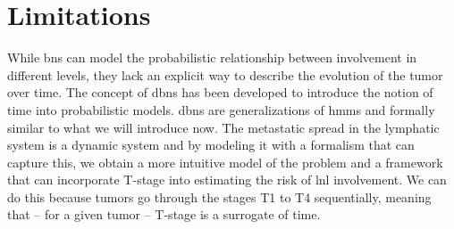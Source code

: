 \documentclass[\relativeRoot/main.tex]{subfiles}
\begin{document}
\section{Limitations}
\label{sec:previous_work:limitations}

While \glspl{bn} can model the probabilistic relationship between involvement in different levels, they lack an explicit way to describe the evolution of the tumor over time. The concept of \glspl{dbn} has been developed to introduce the notion of time into probabilistic models. \Glspl{dbn} are generalizations of \glspl{hmm} and formally similar to what we will introduce now. The metastatic spread in the lymphatic system is a dynamic system and by modeling it with a formalism that can capture this, we obtain a more intuitive model of the problem and a framework that can incorporate T-stage into estimating the risk of \gls{lnl} involvement. We can do this because tumors go through the stages T1 to T4 sequentially, meaning that -- for a given tumor -- T-stage is a surrogate of time.
\end{document}
